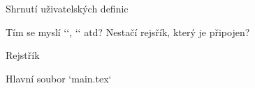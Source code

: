 %
%
%
%
%
%
%
%
%
%
%
%
%
%
\sec[suma] Shrnutí uživatelských definic


Tím se myslí `\amark`, `\tmark` atd? Nestačí rejsřík, který je připojen?


\sec Rejstřík

\def\_sortinglang{en}
\typosize[9/]
\makeindex
\endmulti

\bye





 Hlavní soubor `main.tex`

